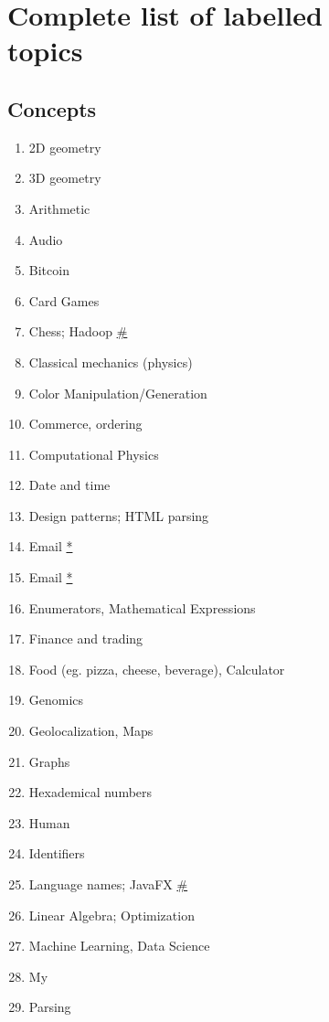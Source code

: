 \documentclass[conference,10pt]{IEEEtran}
\begin{document}
\begin{figure}[H]
\section{Complete list of labelled topics} \label{topics}
\subsection{Concepts}
\begin{multicols}{2}
\begin{enumerate}
    \item 2D geometry
    \item 3D geometry
    \item Arithmetic
    \item Audio
    \item Bitcoin
    \item Card Games
    \item Chess; Hadoop \hyperref[dual]{\#}
    \item Classical mechanics (physics)
    \item Color Manipulation/Generation
    \item Commerce, ordering
    \item Computational Physics 
    \item Date and time
    \item Design patterns; HTML parsing
    \item Email \hyperref[duplicate]{*}
    \item Email \hyperref[duplicate]{*}
    \item Enumerators, Mathematical Expressions
    \item Finance and trading
    \item Food (eg. pizza, cheese, beverage), Calculator
    \item Genomics
    \item Geolocalization, Maps
    \item Graphs
    \item Hexademical numbers
    \item Human
    \item Identifiers
    \item Language names; JavaFX \hyperref[dual]{\#}
    \item Linear Algebra; Optimization
    \item Machine Learning, Data Science
    \item My
    \item Parsing

\end{enumerate}
\end{multicols}
\end{figure}
\end{document}
